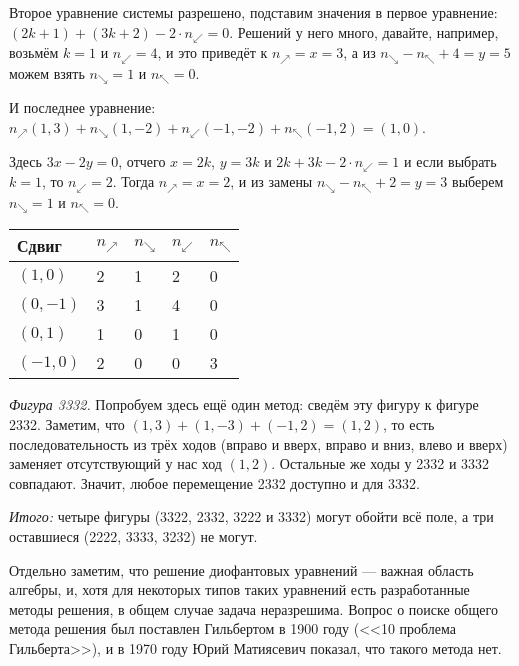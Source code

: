 \begin{itemize}
Второе уравнение системы разрешено, подставим значения в первое уравнение:
$(2k + 1) + (3k + 2) -2\cdot n_\swarrow = 0$. Решений у него много, давайте, например, 
возьмём $k = 1$ и $n_\swarrow=4$, и это приведёт к $n_\nearrow = x = 3$, а из 
$n_\searrow - n_\nwarrow + 4 = y = 5$ можем взять $n_\searrow = 1$ и $n_\nwarrow = 0$.


И последнее уравнение:
$n_\nearrow(1,3) + n_\searrow(1,-2) + n_\swarrow(-1,-2) + n_\nwarrow(-1,2) = (1,0)$.

Здесь $3x - 2y = 0$, отчего $x = 2k$, $y = 3k$ и $2k + 3k - 2\cdot n_\swarrow = 1$ и
если выбрать $k=1$, то $n_\swarrow = 2$. Тогда $n_\nearrow = x = 2$, 
и из замены $n_\searrow - n_\nwarrow + 2 = y = 3$ выберем $n_\searrow = 1$ и $n_\nwarrow = 0$.


\begin{center}\begin{tabular}{lllll}
Сдвиг & $n_\nearrow$ & $n_\searrow$ & $n_\swarrow$ & $n_\nwarrow$ \\
\hline
$(1,0)$  & 2 & 1 & 2 & 0\\
$(0,-1)$ & 3 & 1 & 4 & 0\\
$(0,1)$  & 1 & 0 & 1 & 0\\
$(-1,0)$ & 2 & 0 & 0 & 3
\end{tabular}\end{center}

\emph{Фигура 3332.} Попробуем здесь ещё один метод: сведём эту фигуру к фигуре 2332. 
Заметим, что $(1,3)+(1,-3)+(-1,2) = (1,2)$, то есть последовательность из трёх ходов 
(вправо и вверх, вправо и вниз, влево и вверх) заменяет отсутствующий у нас ход $(1,2)$. 
Остальные же ходы у 2332 и 3332 совпадают. Значит, любое перемещение 2332 доступно и 
для 3332.

\emph{Итого:} четыре фигуры (3322, 2332, 3222 и 3332) могут обойти всё поле, а три оставшиеся
(2222, 3333, 3232) не могут.

Отдельно заметим, что решение диофантовых уравнений --- важная область алгебры, и, хотя для некоторых
типов таких уравнений есть разработанные методы решения, в общем случае задача неразрешима. 
Вопрос о поиске общего метода решения был поставлен Гильбертом в 1900 году (<<10 проблема Гильберта>>), 
и в 1970 году Юрий Матиясевич показал, что такого метода нет.

\end{itemize}

